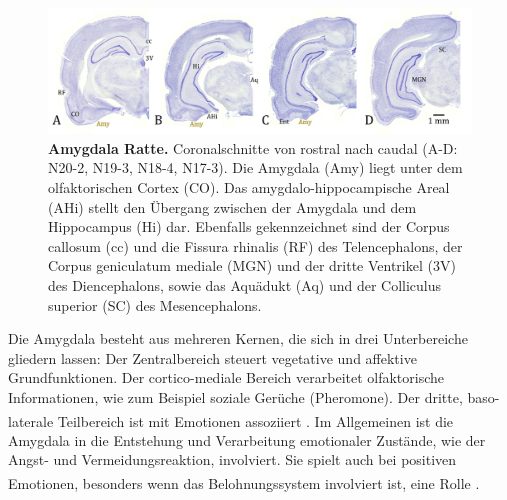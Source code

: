 \documentclass[12pt,a4paper,pdftex]{article}
\begin{document}
\begin{figure}[H]
    \centering
    \includegraphics[width=\textwidth]{pictures/Bilder_Jule/Ratte/amygdala.png}
    \caption[Amygdala Ratte]{\textbf{Amygdala Ratte.} Coronalschnitte von rostral nach caudal (A-D: N20-2, N19-3, N18-4, N17-3). Die Amygdala (Amy) liegt unter dem olfaktorischen Cortex (CO). Das amygdalo-hippocampische Areal (AHi) stellt den Übergang zwischen der Amygdala und dem Hippocampus (Hi) dar. Ebenfalls gekennzeichnet sind der Corpus callosum (cc) und die Fissura rhinalis (RF) des Telencephalons, der Corpus geniculatum mediale (MGN) und der dritte Ventrikel (3V) des Diencephalons, sowie das Aquädukt (Aq) und der Colliculus superior (SC) des Mesencephalons.}
    \label{fig:amygdala_ratte}
\end{figure}{}

\noindent Die Amygdala besteht aus mehreren Kernen, die sich in drei Unterbereiche gliedern lassen: Der Zentralbereich steuert vegetative und affektive Grundfunktionen. Der cortico-mediale Bereich verarbeitet olfaktorische Informationen, wie zum Beispiel soziale Gerüche (Pheromone). Der dritte, baso-laterale Teilbereich ist mit Emotionen assoziiert \textsuperscript{\cite[6]{storch2012lehrbuchzoo}}. Im Allgemeinen ist die Amygdala in die Entstehung und Verarbeitung emotionaler Zustände, wie der Angst- und   Vermeidungsreaktion, involviert. Sie spielt auch bei positiven Emotionen, besonders wenn das Belohnungssystem involviert ist, eine Rolle \textsuperscript{\cite[48]{kandel2013principles}}.\\
\end{document}
